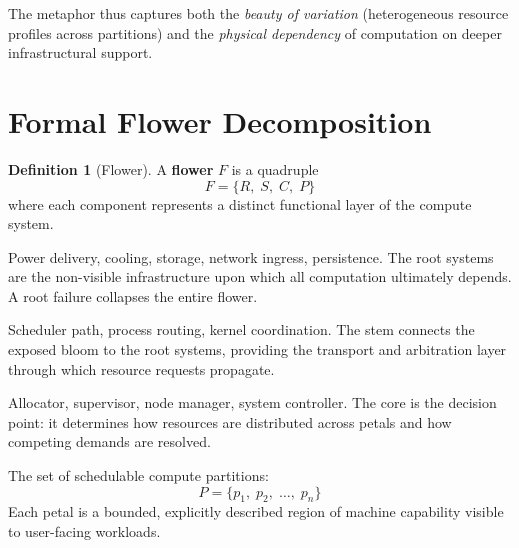 \documentclass[11pt, a4paper, oneside]{article}
\theoremstyle{definition}
\newtheorem{definition}{Definition}[section]
\begin{document}
The metaphor thus captures both the \emph{beauty of variation} (heterogeneous
resource profiles across partitions) and the \emph{physical dependency} of
computation on deeper infrastructural support.

\section{Formal Flower Decomposition}

\begin{definition}[Flower]
A \textbf{flower} $F$ is a quadruple
\begin{equation}
  F = \bigl\{ R,\; S,\; C,\; P \bigr\}
\end{equation}
where each component represents a distinct functional layer of the compute
system.
\end{definition}

\begin{tcolorbox}[colback=rootcol, title={\textbf{$R$ — Root Systems (Support Layer)}}]
Power delivery, cooling, storage, network ingress, persistence.
The root systems are the non-visible infrastructure upon which all
computation ultimately depends.  A root failure collapses the entire flower.
\end{tcolorbox}

\begin{tcolorbox}[colback=stemcol, title={\textbf{$S$ — Stem (Transport and Control Backbone)}}]
Scheduler path, process routing, kernel coordination.
The stem connects the exposed bloom to the root systems, providing the
transport and arbitration layer through which resource requests propagate.
\end{tcolorbox}

\begin{tcolorbox}[colback=corecol, title={\textbf{$C$ — Core (Orchestration Center)}}]
Allocator, supervisor, node manager, system controller.
The core is the decision point: it determines how resources are distributed
across petals and how competing demands are resolved.
\end{tcolorbox}

\begin{tcolorbox}[colback=petalcol, title={\textbf{$P$ — Petals (Exposed Compute Partitions)}}]
The set of schedulable compute partitions:
\begin{equation}
  P = \bigl\{ p_1,\; p_2,\; \ldots,\; p_n \bigr\}
\end{equation}
Each petal is a bounded, explicitly described region of machine capability
visible to user-facing workloads.
\end{tcolorbox}
\end{document}
